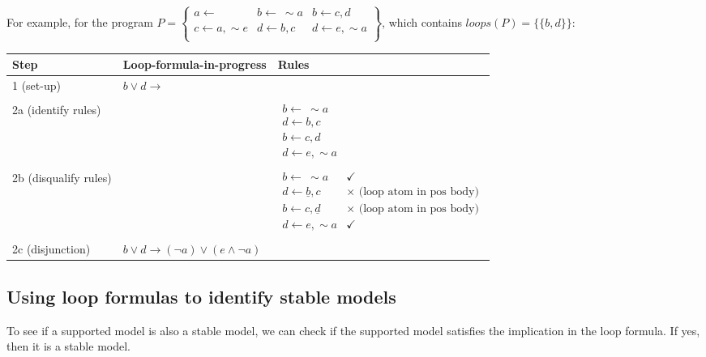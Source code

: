 \documentclass[9pt,a4paper,landscape]{article}
\begin{document}
{For example, for the program $P = \left\{\begin{array}{lll}
a \leftarrow & b \leftarrow\ \sim a & b \leftarrow c, d\\
c \leftarrow a, \sim e & d \leftarrow b, c & d \leftarrow e, \sim a\\
\end{array}\right\}$, which contains $loops(P) = \{ \{b, d\} \}$:

\begin{center}
	\begin{tabular}{p{3cm}p{5cm}p{6cm}}
		Step & Loop-formula-in-progress & Rules \\ \midrule
		1 (set-up) & $b \lor d \rightarrow$ & \\ & \\
		2a (identify rules) &  & $\begin{array}{l}
		b \leftarrow\ \sim a\\
		d \leftarrow b, c\\
		b \leftarrow c, d\\
		d \leftarrow e, \sim a
		\end{array}$  \\ & \\
		2b (disqualify rules) &  & $\begin{array}{ll}
		b \leftarrow\ \sim a & \checkmark \\
		d \leftarrow \underline{b}, c & \times  \text{ (loop atom in pos body)}\\
		b \leftarrow c, \underline{d} & \times  \text{ (loop atom in pos body)}\\
		d \leftarrow e, \sim a & \checkmark
		\end{array}$  \\ & \\
		2c (disjunction) & $b \lor d \rightarrow (\neg a) \lor (e \land \neg a)$
	\end{tabular}
\end{center}

\vspace{\baselineskip}


\subsection{Using loop formulas to identify stable models}

To see if a supported model is also a stable model, we can check if the supported model satisfies the implication in the loop formula.
If yes, then it is a stable model.

}
\end{document}
